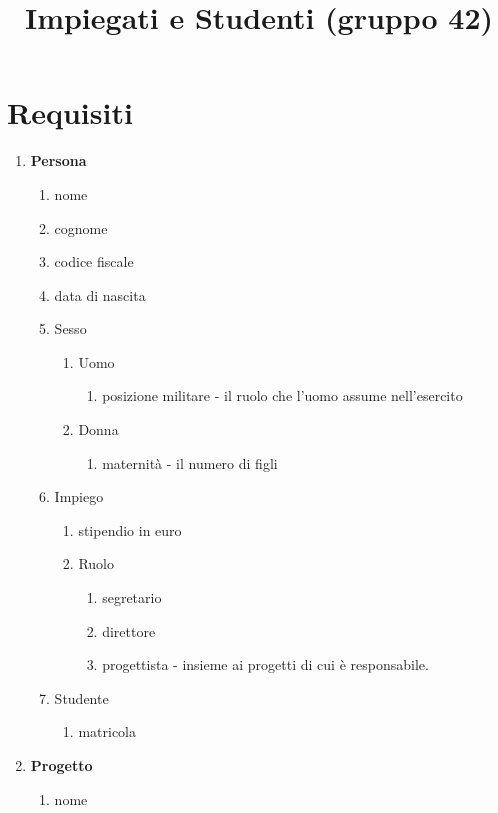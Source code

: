 \documentclass[12pt, letterpaper]{article}
\title{Impiegati e Studenti (gruppo 42)}
\date{}
\begin{document}
\maketitle


\section{Requisiti}
\begin{enumerate}
    \item \textbf{Persona}\begin{enumerate}
        \item nome 
        \item cognome 
        \item codice fiscale 
        \item data di nascita
        \item Sesso \begin{enumerate}
        \item Uomo \begin{enumerate}
            \item posizione militare - il ruolo che l'uomo assume nell'esercito
        \end{enumerate}
        \item Donna \begin{enumerate}
            \item maternità - il numero di figli
        \end{enumerate}
    \end{enumerate}
    \item Impiego\begin{enumerate}
        \item stipendio in euro
        \item Ruolo\begin{enumerate}
            \item segretario 
            \item direttore 
            \item progettista - insieme ai progetti di cui è responsabile.
        \end{enumerate}
    \end{enumerate}
    \item Studente \begin{enumerate}
        \item matricola
    \end{enumerate}
    \end{enumerate}
    \item\textbf{Progetto} \begin{enumerate}
        \item nome
    \end{enumerate}
\end{enumerate}
\newpage
\end{document}
